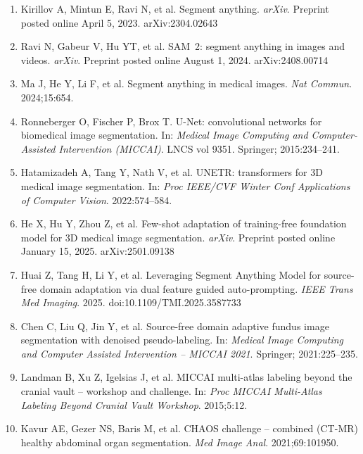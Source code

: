 \documentclass[11pt,a4paper]{article}
\begin{document}
\begin{enumerate}
\small
\item Kirillov A, Mintun E, Ravi N, et al.
      Segment anything.
      \textit{arXiv}. Preprint posted online April 5, 2023. arXiv:2304.02643

\item Ravi N, Gabeur V, Hu YT, et al.
      SAM~2: segment anything in images and videos.
      \textit{arXiv}. Preprint posted online August 1, 2024. arXiv:2408.00714

\item Ma J, He Y, Li F, et al.
      Segment anything in medical images.
      \textit{Nat Commun}. 2024;15:654.

\item Ronneberger O, Fischer P, Brox T.
      U-Net: convolutional networks for biomedical image segmentation.
      In: \textit{Medical Image Computing and Computer-Assisted Intervention (MICCAI)}. LNCS vol 9351. Springer; 2015:234--241.

\item Hatamizadeh A, Tang Y, Nath V, et al.
      UNETR: transformers for 3D medical image segmentation.
      In: \textit{Proc IEEE/CVF Winter Conf Applications of Computer Vision}. 2022:574--584.

\item He X, Hu Y, Zhou Z, et al.
      Few-shot adaptation of training-free foundation model for 3D medical image segmentation.
      \textit{arXiv}. Preprint posted online January 15, 2025. arXiv:2501.09138

\item Huai Z, Tang H, Li Y, et al.
      Leveraging Segment Anything Model for source-free domain adaptation via dual feature guided auto-prompting.
      \textit{IEEE Trans Med Imaging}. 2025. doi:10.1109/TMI.2025.3587733

\item Chen C, Liu Q, Jin Y, et al.
      Source-free domain adaptive fundus image segmentation with denoised pseudo-labeling.
      In: \textit{Medical Image Computing and Computer Assisted Intervention -- MICCAI 2021}. Springer; 2021:225--235.

\item Landman B, Xu Z, Igelsias J, et al.
      MICCAI multi-atlas labeling beyond the cranial vault -- workshop and challenge.
      In: \textit{Proc MICCAI Multi-Atlas Labeling Beyond Cranial Vault Workshop}. 2015;5:12.

\item Kavur AE, Gezer NS, Baris M, et al.
      CHAOS challenge -- combined (CT-MR) healthy abdominal organ segmentation.
      \textit{Med Image Anal}. 2021;69:101950.
\end{enumerate}
\end{document}
